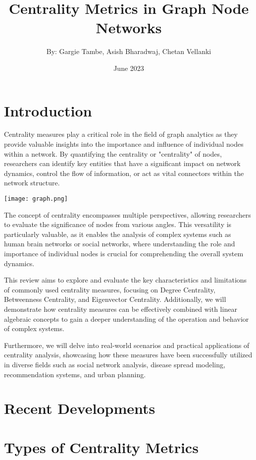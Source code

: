 \documentclass{article}
\title{Centrality Metrics in Graph Node Networks}
\author{By: Gargie Tambe, Asish Bharadwaj, Chetan Vellanki}
\date{June 2023}
\begin{document}
\maketitle

\section*{Introduction}
Centrality measures play a critical role in the field of graph analytics as they provide valuable insights into the importance and influence of individual nodes within a network. By quantifying the centrality or "centrality" of nodes, researchers can identify key entities that have a significant impact on network dynamics, control the flow of information, or act as vital connectors within the network structure.

\begin{center}
    \texttt{[image: graph.png]}  
\end{center}

The concept of centrality encompasses multiple perspectives, allowing researchers to evaluate the significance of nodes from various angles. This versatility is particularly valuable, as it enables the analysis of complex systems such as human brain networks or social networks, where understanding the role and importance of individual nodes is crucial for comprehending the overall system dynamics.

This review aims to explore and evaluate the key characteristics and limitations of commonly used centrality measures, focusing on Degree Centrality, Betweenness Centrality, and Eigenvector Centrality. Additionally, we will demonstrate how centrality measures can be effectively combined with linear algebraic concepts to gain a deeper understanding of the operation and behavior of complex systems.

Furthermore, we will delve into real-world scenarios and practical applications of centrality analysis, showcasing how these measures have been successfully utilized in diverse fields such as social network analysis, disease spread modeling, recommendation systems, and urban planning.

\section*{Recent Developments}

\section*{Types of Centrality Metrics}
\end{document}
